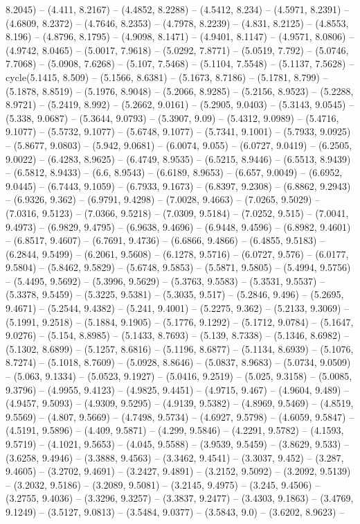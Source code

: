8.2045) -- (4.411, 8.2167) -- (4.4852, 8.2288) -- (4.5412, 8.234) -- (4.5971, 8.2391) -- (4.6809, 8.2372) -- (4.7646, 8.2353) -- (4.7978, 8.2239) -- (4.831, 8.2125) -- (4.8553, 8.196) -- (4.8796, 8.1795) -- (4.9098, 8.1471) -- (4.9401, 8.1147) -- (4.9571, 8.0806) -- (4.9742, 8.0465) -- (5.0017, 7.9618) -- (5.0292, 7.8771) -- (5.0519, 7.792) -- (5.0746, 7.7068) -- (5.0908, 7.6268) -- (5.107, 7.5468) -- (5.1104, 7.5548) -- (5.1137, 7.5628) -- cycle(5.1415, 8.509) -- (5.1566, 8.6381) -- (5.1673, 8.7186) -- (5.1781, 8.799) -- (5.1878, 8.8519) -- (5.1976, 8.9048) -- (5.2066, 8.9285) -- (5.2156, 8.9523) -- (5.2288, 8.9721) -- (5.2419, 8.992) -- (5.2662, 9.0161) -- (5.2905, 9.0403) -- (5.3143, 9.0545) -- (5.338, 9.0687) -- (5.3644, 9.0793) -- (5.3907, 9.09) -- (5.4312, 9.0989) -- (5.4716, 9.1077) -- (5.5732, 9.1077) -- (5.6748, 9.1077) -- (5.7341, 9.1001) -- (5.7933, 9.0925) -- (5.8677, 9.0803) -- (5.942, 9.0681) -- (6.0074, 9.055) -- (6.0727, 9.0419) -- (6.2505, 9.0022) -- (6.4283, 8.9625) -- (6.4749, 8.9535) -- (6.5215, 8.9446) -- (6.5513, 8.9439) -- (6.5812, 8.9433) -- (6.6, 8.9543) -- (6.6189, 8.9653) -- (6.657, 9.0049) -- (6.6952, 9.0445) -- (6.7443, 9.1059) -- (6.7933, 9.1673) -- (6.8397, 9.2308) -- (6.8862, 9.2943) -- (6.9326, 9.362) -- (6.9791, 9.4298) -- (7.0028, 9.4663) -- (7.0265, 9.5029) -- (7.0316, 9.5123) -- (7.0366, 9.5218) -- (7.0309, 9.5184) -- (7.0252, 9.515) -- (7.0041, 9.4973) -- (6.9829, 9.4795) -- (6.9638, 9.4696) -- (6.9448, 9.4596) -- (6.8982, 9.4601) -- (6.8517, 9.4607) -- (6.7691, 9.4736) -- (6.6866, 9.4866) -- (6.4855, 9.5183) -- (6.2844, 9.5499) -- (6.2061, 9.5608) -- (6.1278, 9.5716) -- (6.0727, 9.576) -- (6.0177, 9.5804) -- (5.8462, 9.5829) -- (5.6748, 9.5853) -- (5.5871, 9.5805) -- (5.4994, 9.5756) -- (5.4495, 9.5692) -- (5.3996, 9.5629) -- (5.3763, 9.5583) -- (5.3531, 9.5537) -- (5.3378, 9.5459) -- (5.3225, 9.5381) -- (5.3035, 9.517) -- (5.2846, 9.496) -- (5.2695, 9.4671) -- (5.2544, 9.4382) -- (5.241, 9.4001) -- (5.2275, 9.362) -- (5.2133, 9.3069) -- (5.1991, 9.2518) -- (5.1884, 9.1905) -- (5.1776, 9.1292) -- (5.1712, 9.0784) -- (5.1647, 9.0276) -- (5.154, 8.8985) -- (5.1433, 8.7693) -- (5.139, 8.7338) -- (5.1346, 8.6982) -- (5.1302, 8.6899) -- (5.1257, 8.6816) -- (5.1196, 8.6877) -- (5.1134, 8.6939) -- (5.1076, 8.7274) -- (5.1018, 8.7609) -- (5.0928, 8.8646) -- (5.0837, 8.9683) -- (5.0734, 9.0509) -- (5.063, 9.1334) -- (5.0523, 9.1927) -- (5.0416, 9.2519) -- (5.025, 9.3158) -- (5.0085, 9.3796) -- (4.9955, 9.4123) -- (4.9825, 9.4451) -- (4.9715, 9.467) -- (4.9604, 9.489) -- (4.9457, 9.5093) -- (4.9309, 9.5295) -- (4.9139, 9.5382) -- (4.8969, 9.5469) -- (4.8519, 9.5569) -- (4.807, 9.5669) -- (4.7498, 9.5734) -- (4.6927, 9.5798) -- (4.6059, 9.5847) -- (4.5191, 9.5896) -- (4.409, 9.5871) -- (4.299, 9.5846) -- (4.2291, 9.5782) -- (4.1593, 9.5719) -- (4.1021, 9.5653) -- (4.045, 9.5588) -- (3.9539, 9.5459) -- (3.8629, 9.533) -- (3.6258, 9.4946) -- (3.3888, 9.4563) -- (3.3462, 9.4541) -- (3.3037, 9.452) -- (3.287, 9.4605) -- (3.2702, 9.4691) -- (3.2427, 9.4891) -- (3.2152, 9.5092) -- (3.2092, 9.5139) -- (3.2032, 9.5186) -- (3.2089, 9.5081) -- (3.2145, 9.4975) -- (3.245, 9.4506) -- (3.2755, 9.4036) -- (3.3296, 9.3257) -- (3.3837, 9.2477) -- (3.4303, 9.1863) -- (3.4769, 9.1249) -- (3.5127, 9.0813) -- (3.5484, 9.0377) -- (3.5843, 9.0) -- (3.6202, 8.9623) -- 